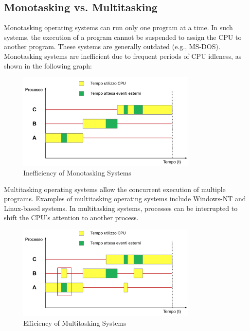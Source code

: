 \subsection{Monotasking vs. Multitasking}
Monotasking operating systems can run only one program at a time. In such systems, the execution of a program cannot be suspended to assign the CPU to another program. These systems are generally outdated (e.g., MS-DOS). Monotasking systems are inefficient due to frequent periods of CPU idleness, as shown in the following graph:

\begin{figure}[h]
    \centering
    \includegraphics[width=0.8\textwidth]{images/monotask.png}
    \caption{Inefficiency of Monotasking Systems}
    \label{fig:monotasking_inefficiency}
\end{figure}

Multitasking operating systems allow the concurrent execution of multiple programs. Examples of multitasking operating systems include Windows-NT and Linux-based systems. In multitasking systems, processes can be interrupted to shift the CPU's attention to another process.

\begin{figure}[h]
    \centering
    \includegraphics[width=0.8\textwidth]{images/multitask.png}
    \caption{Efficiency of Multitasking Systems}
    \label{fig:multitasking_efficiency}
\end{figure}

